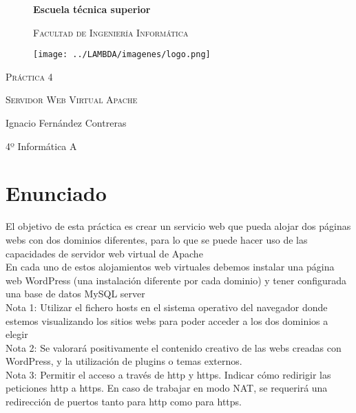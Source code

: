\documentclass{article}
\begin{document}
\begin{titlepage}
\centering
\begin{figure}

\centering
{\bfseries\LARGE Escuela técnica superior\par}
{\scshape\Large Facultad de Ingeniería Informática\par}
\vspace{4cm}
\centering
\begin{Huge}
\begin{center}
\texttt{[image: ../LAMBDA/imagenes/logo.png]} 
 
\end{center}

\end{Huge}
\end{figure}


{\scshape\Huge Práctica 4\par}
{\scshape\Large Servidor Web Virtual Apache\par}
\vspace{10cm}
{\Large Ignacio Fernández Contreras\par}
{\Large 4º Informática A\par}
\vfill

\end{titlepage}
\clearpage\hbox{}\thispagestyle{empty}\newpage


\tableofcontents
\newpage

\section{Enunciado}
\begin{flushleft}
El objetivo de esta práctica es crear un servicio web que pueda alojar dos páginas webs con dos
dominios diferentes, para lo que se puede hacer uso de las capacidades de servidor web virtual de
Apache\\
En cada uno de estos alojamientos web virtuales debemos instalar una página web WordPress (una
instalación diferente por cada dominio) y tener configurada una base de datos MySQL server\\
Nota 1: Utilizar el fichero hosts en el sistema operativo del navegador donde estemos visualizando
los sitios webs para poder acceder a los dos dominios a elegir\\
Nota 2: Se valorará positivamente el contenido creativo de las webs creadas con WordPress, y la
utilización de plugins o temas externos. \\
Nota 3: Permitir el acceso a través de http y https. Indicar cómo redirigir las peticiones http a https.
En caso de trabajar en modo NAT, se requerirá una redirección de puertos tanto para http como para
https.\\

\end{flushleft}
\end{document}
